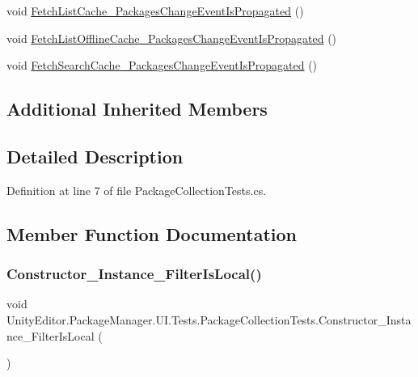 \begin{DoxyCompactItemize}
\item 
void \mbox{\hyperlink{class_unity_editor_1_1_package_manager_1_1_u_i_1_1_tests_1_1_package_collection_tests_ab0f1f5353902a2b2288e002845ed0336}{Fetch\+List\+Cache\+\_\+\+Packages\+Change\+Event\+Is\+Propagated}} ()
\item 
void \mbox{\hyperlink{class_unity_editor_1_1_package_manager_1_1_u_i_1_1_tests_1_1_package_collection_tests_adac0c072dc5dbf1823dcbeafecb03749}{Fetch\+List\+Offline\+Cache\+\_\+\+Packages\+Change\+Event\+Is\+Propagated}} ()
\item 
void \mbox{\hyperlink{class_unity_editor_1_1_package_manager_1_1_u_i_1_1_tests_1_1_package_collection_tests_a078005e8c0ca533a653fcbfc2279f096}{Fetch\+Search\+Cache\+\_\+\+Packages\+Change\+Event\+Is\+Propagated}} ()
\end{DoxyCompactItemize}
\subsection*{Additional Inherited Members}


\subsection{Detailed Description}


Definition at line 7 of file Package\+Collection\+Tests.\+cs.



\subsection{Member Function Documentation}
\mbox{\label{class_unity_editor_1_1_package_manager_1_1_u_i_1_1_tests_1_1_package_collection_tests_ae499cfbdbc1bc06ce717df7db3800bad}} 
\subsubsection{\texorpdfstring{Constructor\_Instance\_FilterIsLocal()}{Constructor\_Instance\_FilterIsLocal()}}
{\footnotesize\ttfamily void Unity\+Editor.\+Package\+Manager.\+U\+I.\+Tests.\+Package\+Collection\+Tests.\+Constructor\+\_\+\+Instance\+\_\+\+Filter\+Is\+Local (\begin{DoxyParamCaption}{ }\end{DoxyParamCaption})}



